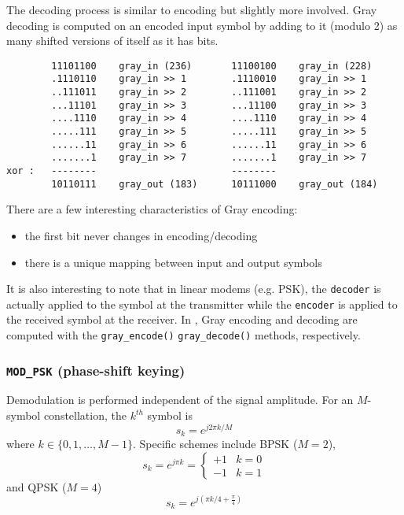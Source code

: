 The decoding process is similar to encoding but slightly more involved.
Gray decoding is computed on an encoded input symbol
by adding to it (modulo 2) as many shifted versions of itself as it has bits.
\begin{verbatim}
        11101100    gray_in (236)       11100100    gray_in (228)
        .1110110    gray_in >> 1        .1110010    gray_in >> 1
        ..111011    gray_in >> 2        ..111001    gray_in >> 2
        ...11101    gray_in >> 3        ...11100    gray_in >> 3
        ....1110    gray_in >> 4        ....1110    gray_in >> 4
        .....111    gray_in >> 5        .....111    gray_in >> 5
        ......11    gray_in >> 6        ......11    gray_in >> 6
        .......1    gray_in >> 7        .......1    gray_in >> 7
xor :   --------                        --------
        10110111    gray_out (183)      10111000    gray_out (184)
\end{verbatim}
There are a few interesting characteristics of Gray encoding:
\begin{itemize}
\item the first bit never changes in encoding/decoding
\item there is a unique mapping between input and output symbols
\end{itemize}
It is also interesting to note that in linear modems (e.g. PSK), the
{\tt decoder} is actually applied to the symbol at the transmitter while the
{\tt encoder} is applied to the received symbol at the receiver.
In \liquid, Gray encoding and decoding are computed with the
{\tt gray\_encode()} {\tt gray\_decode()} methods, respectively.

\subsubsection{{\tt MOD\_PSK} (phase-shift keying)}
Demodulation is performed independent of the signal amplitude.
For an $M$-symbol constellation, the $k^{th}$ symbol is
\[
    s_k = e^{j 2 \pi k/M}
\]
where $k \in \{0,1,\ldots,M-1\}$.
Specific schemes include BPSK ($M=2$),
\[
    s_k = e^{j \pi k} =
    \begin{cases}
        +1 & k=0 \\
        -1 & k=1
    \end{cases}
\]
and QPSK ($M=4$)
\[
    s_k = e^{j\left(\pi k/4 + \frac{\pi}{4}\right)}
\]

